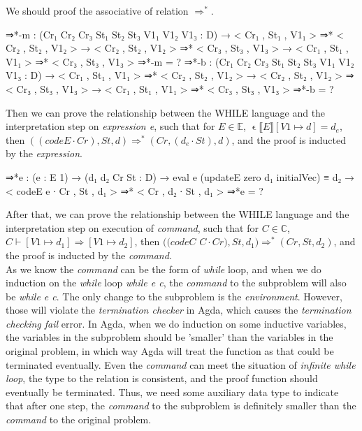 \documentclass{jfrarticle}
\begin{document}
We should proof the associative of relation $\Rightarrow^*$.
\begin{code}[fontsize=\small]
  ⇒*-m : (Cr₁ Cr₂ Cr₃ St₁ St₂ St₃ V1₁ V1₂ V1₃ : D)
              → < Cr₁ , St₁ , V1₁ > ⇒* < Cr₂ , St₂ , V1₂ >
              → < Cr₂ , St₂ , V1₂ > ⇒* < Cr₃ , St₃ , V1₃ >
              → < Cr₁ , St₁ , V1₁ > ⇒* < Cr₃ , St₃ , V1₃ >
  ⇒*-m = ?
  ⇒*-b : (Cr₁ Cr₂ Cr₃ St₁ St₂ St₃ V1₁ V1₂ V1₃ : D)
              → < Cr₁ , St₁ , V1₁ > ⇒* < Cr₂ , St₂ , V1₂ >
              → < Cr₂ , St₂ , V1₂ > ⇒  < Cr₃ , St₃ , V1₃ >
              → < Cr₁ , St₁ , V1₁ > ⇒* < Cr₃ , St₃ , V1₃ >
  ⇒*-b = ?
\end{code}
Then we can prove the relationship between the WHILE language and the interpretation step on \textit{expression e}, such that for $E \in \mathds{E}$, $\upvarepsilon \llbracket E \rrbracket [V1 \mapsto d] = d_e$, then $((codeE\cdot Cr),St,d)\Rightarrow^*(Cr,(d_e\cdot St),d)$, and the proof is inducted by the \textit{expression}.
\begin{code}[fontsize=\small]
⇒*e : (e : E 1) → (d₁ d₂ Cr St : D)
       → eval e (updateE zero d₁ initialVec) ≡ d₂
       → < codeE e ∙ Cr , St , d₁ > ⇒* < Cr , d₂ ∙ St , d₁ >
⇒*e = ?
\end{code}
After that, we can prove the relationship between the WHILE language and the interpretation step on execution of \textit{command}, such that for $C \in \mathds{C}$, $C \vdash [V1 \mapsto d_1] \Rightarrow [V1 \mapsto d_2]$, then $((codeC$ $C\cdot Cr),St,d_1)\Rightarrow^*(Cr,St,d_2)$, and the proof is inducted by the \textit{command}.\\
As we know the \textit{command} can be the form of \textit{while} loop, and when we do induction on the \textit{while} loop \textit{while e c}, the \textit{command} to the subproblem will also be \textit{while e c}.
The only change to the subproblem is the \textit{environment}.
However, those will violate the \textit{termination checker} in Agda, which causes the \textit{termination checking fail} error.
In Agda, when we do induction on some inductive variables, the variables in the subproblem should be 'smaller' than the variables in the original problem, in which way Agda will treat the function as that could be terminated eventually.
Even the \textit{command} can meet the situation of \textit{infinite while loop}, the type to the relation is consistent, and the proof function should eventually be terminated.
Thus, we need some auxiliary data type to indicate that after one step, the \textit{command} to the subproblem is definitely smaller than the \textit{command} to the original problem.
\end{document}
